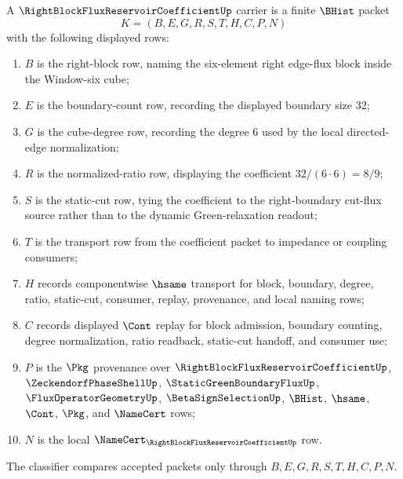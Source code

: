 \begin{definition}
\label{def:right-block-flux-reservoir-coefficient-carrier}
A $\RightBlockFluxReservoirCoefficientUp$ carrier is a finite $\BHist$ packet
$$
K=(B,E,G,R,S,T,H,C,P,N)
$$
with the following displayed rows:
\begin{enumerate}
\item $B$ is the right-block row, naming the six-element right edge-flux block inside the Window-six cube;
\item $E$ is the boundary-count row, recording the displayed boundary size $32$;
\item $G$ is the cube-degree row, recording the degree $6$ used by the local directed-edge normalization;
\item $R$ is the normalized-ratio row, displaying the coefficient $32/(6\cdot 6)=8/9$;
\item $S$ is the static-cut row, tying the coefficient to the right-boundary cut-flux source rather than to the dynamic Green-relaxation readout;
\item $T$ is the transport row from the coefficient packet to impedance or coupling consumers;
\item $H$ records componentwise $\hsame$ transport for block, boundary, degree, ratio, static-cut, consumer, replay, provenance, and local naming rows;
\item $C$ records displayed $\Cont$ replay for block admission, boundary counting, degree normalization, ratio readback, static-cut handoff, and consumer use;
\item $P$ is the $\Pkg$ provenance over $\RightBlockFluxReservoirCoefficientUp$, $\ZeckendorfPhaseShellUp$, $\StaticGreenBoundaryFluxUp$, $\FluxOperatorGeometryUp$, $\BetaSignSelectionUp$, $\BHist$, $\hsame$, $\Cont$, $\Pkg$, and $\NameCert$ rows;
\item $N$ is the local $\NameCert_{\RightBlockFluxReservoirCoefficientUp}$ row.
\end{enumerate}
The classifier compares accepted packets only through $B,E,G,R,S,T,H,C,P,N$.
\end{definition}

